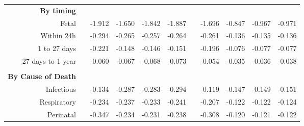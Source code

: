 \begin{table}[h!]
\begin{footnotesize}
\begin{center}
{\begin{threeparttable}[b]
\begin{tabular}{rrrrrrrrrrr}
    \multicolumn{1}{p{15.145em}}{\textbf{By timing}} &       &       &       &       &       &       &       &       &       &  \\
    \multicolumn{1}{p{15.145em}}{Fetal} &       & \multicolumn{1}{c}{-1.912} & \multicolumn{1}{c}{-1.650} & \multicolumn{1}{c}{-1.842} & \multicolumn{1}{c}{-1.887} &       & \multicolumn{1}{c}{-1.696} & \multicolumn{1}{c}{-0.847} & \multicolumn{1}{c}{-0.967} & \multicolumn{1}{c}{-0.971} \\
    \multicolumn{1}{p{15.145em}}{Within 24h} &       & \multicolumn{1}{c}{-0.294} & \multicolumn{1}{c}{-0.265} & \multicolumn{1}{c}{-0.257} & \multicolumn{1}{c}{-0.264} &       & \multicolumn{1}{c}{-0.261} & \multicolumn{1}{c}{-0.136} & \multicolumn{1}{c}{-0.135} & \multicolumn{1}{c}{-0.136} \\
    \multicolumn{1}{p{15.145em}}{1 to 27 days} &       & \multicolumn{1}{c}{-0.221} & \multicolumn{1}{c}{-0.148} & \multicolumn{1}{c}{-0.146} & \multicolumn{1}{c}{-0.151} &       & \multicolumn{1}{c}{-0.196} & \multicolumn{1}{c}{-0.076} & \multicolumn{1}{c}{-0.077} & \multicolumn{1}{c}{-0.077} \\
    \multicolumn{1}{p{15.145em}}{27 days to 1 year} &       & \multicolumn{1}{c}{-0.060} & \multicolumn{1}{c}{-0.067} & \multicolumn{1}{c}{-0.068} & \multicolumn{1}{c}{-0.073} &       & \multicolumn{1}{c}{-0.054} & \multicolumn{1}{c}{-0.035} & \multicolumn{1}{c}{-0.036} & \multicolumn{1}{c}{-0.038} \\
          &       &       &       &       &       &       &       &       &       &  \\
    \multicolumn{1}{p{15.145em}}{\textbf{By Cause of Death}} &       &       &       &       &       &       &       &       &       &  \\
    \multicolumn{1}{p{15.145em}}{Infectious} &       & \multicolumn{1}{c}{-0.134} & \multicolumn{1}{c}{-0.287} & \multicolumn{1}{c}{-0.283} & \multicolumn{1}{c}{-0.294} &       & \multicolumn{1}{c}{-0.119} & \multicolumn{1}{c}{-0.147} & \multicolumn{1}{c}{-0.149} & \multicolumn{1}{c}{-0.151} \\
    \multicolumn{1}{p{15.145em}}{Respiratory} &       & \multicolumn{1}{c}{-0.234} & \multicolumn{1}{c}{-0.237} & \multicolumn{1}{c}{-0.233} & \multicolumn{1}{c}{-0.241} &       & \multicolumn{1}{c}{-0.207} & \multicolumn{1}{c}{-0.122} & \multicolumn{1}{c}{-0.122} & \multicolumn{1}{c}{-0.124} \\
    \multicolumn{1}{p{15.145em}}{Perinatal} &       & \multicolumn{1}{c}{-0.347} & \multicolumn{1}{c}{-0.234} & \multicolumn{1}{c}{-0.231} & \multicolumn{1}{c}{-0.238} &       & \multicolumn{1}{c}{-0.308} & \multicolumn{1}{c}{-0.120} & \multicolumn{1}{c}{-0.121} & \multicolumn{1}{c}{-0.122} \\

\end{tabular}
\end{threeparttable}}
\end{center}
\end{footnotesize}
\end{table}
